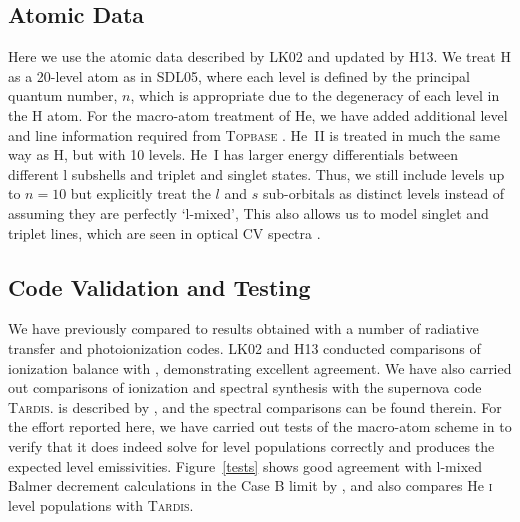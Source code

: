 \documentclass[preprint, a4paper, 11pt]{aastex}
\begin{document}
{\subsection{Atomic Data}
Here we use the atomic data described by LK02 and updated by H13. We treat H as a 20-level atom as in SDL05, where 
each level is defined by the principal quantum number, $n$, which is appropriate due to
the degeneracy of each level in the H atom. For the macro-atom treatment of He, 
we have added additional level and line information required 
from \textsc{Topbase} \citep{topbase2005}. He~\textsc{II} is treated in much the same way as H,
but with 10 levels. He~\textsc{I} has larger energy differentials between different l subshells
and triplet and singlet states. Thus, we still include levels up to $n=10$ but explicitly 
treat the $l$ and $s$ sub-orbitals as distinct levels instead of assuming they are perfectly `l-mixed',
This also allows us to model singlet and 
triplet lines, which are seen in optical CV spectra \citep[e.g.][]{dhillon1996}.



\subsection{Code Validation and Testing}

We have previously compared \py to results obtained with  a number of radiative transfer and
photoionization codes. LK02 and H13 conducted comparisons of ionization balance 
with \cld \citep{cloudy2013}, demonstrating excellent agreement. 
We have also carried out comparisons
of ionization and spectral synthesis with the supernova code \textsc{Tardis.} \tar is described by
\cite{kerzendorfsim}, and the spectral comparisons can be found therein.
For the effort reported here, we have carried out tests of
the macro-atom scheme in \py to verify that it does indeed solve for level populations correctly
and produces the expected level emissivities. Figure~\ref{tests} shows good agreement with 
l-mixed Balmer decrement calculations in the Case B limit by \cite{seaton1959}, and 
also compares He \textsc{i} level populations with \textsc{Tardis.}



}
\end{document}
